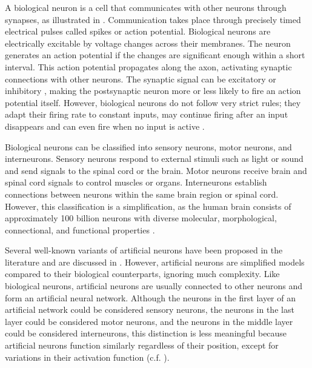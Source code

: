A biological neuron is a cell that communicates with other neurons through synapses, as illustrated in .
Communication takes place through precisely timed electrical pulses called spikes or action potential.
Biological neurons are electrically excitable by voltage changes across their membranes.
The neuron generates an action potential if the changes are significant enough within a short interval.
This action potential propagates along the axon, activating synaptic connections with other neurons.
The synaptic signal can be excitatory  or inhibitory , making the postsynaptic neuron more or less likely to fire an action potential itself.
However, biological neurons do not follow very strict rules; they adapt their firing rate to constant inputs, may continue firing after an input disappears and can even fire when no input is active \cite{wilson_spontaneous_1981, diamond_identifying_2019}.

Biological neurons can be classified into sensory neurons, motor neurons, and interneurons.
Sensory neurons respond to external stimuli such as light or sound and send signals to the spinal cord or the brain.
Motor neurons receive brain and spinal cord signals to control muscles or organs.
Interneurons establish connections between neurons within the same brain region or spinal cord.
However, this classification is a simplification, as the human brain consists of approximately 100 billion neurons  with diverse molecular, morphological, connectional, and functional properties .

Several well-known variants of artificial neurons have been proposed in the literature and are discussed in .
However, artificial neurons are simplified models compared to their biological counterparts, ignoring much complexity. Like biological neurons, artificial neurons are usually connected to other neurons and form an artificial neural network. Although the neurons in the first layer of an artificial network could be considered sensory neurons, the neurons in the last layer could be considered motor neurons, and the neurons in the middle layer could be considered interneurons, this distinction is less meaningful because artificial neurons function similarly regardless of their position, except for variations in their activation function (c.f. ).

